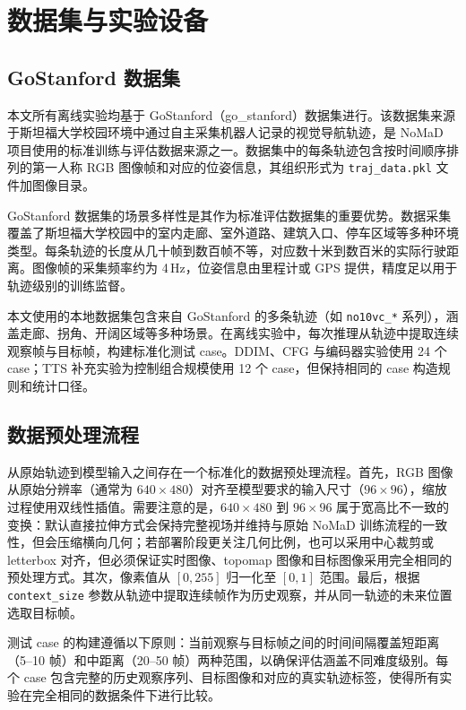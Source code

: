 \section{数据集与实验设备}

\subsection{GoStanford 数据集}

本文所有离线实验均基于 GoStanford（go\_stanford）数据集进行。该数据集来源于斯坦福大学校园环境中通过自主采集机器人记录的视觉导航轨迹，是 NoMaD 项目使用的标准训练与评估数据来源之一\cite{gnm2022,vint2023,nomad2023}。数据集中的每条轨迹包含按时间顺序排列的第一人称 RGB 图像帧和对应的位姿信息，其组织形式为 \texttt{traj\_data.pkl} 文件加图像目录。

GoStanford 数据集的场景多样性是其作为标准评估数据集的重要优势。数据采集覆盖了斯坦福大学校园中的室内走廊、室外道路、建筑入口、停车区域等多种环境类型。每条轨迹的长度从几十帧到数百帧不等，对应数十米到数百米的实际行驶距离。图像帧的采集频率约为 4\,Hz，位姿信息由里程计或 GPS 提供，精度足以用于轨迹级别的训练监督。

本文使用的本地数据集包含来自 GoStanford 的多条轨迹（如 \texttt{no10vc\_*} 系列），涵盖走廊、拐角、开阔区域等多种场景。在离线实验中，每次推理从轨迹中提取连续观察帧与目标帧，构建标准化测试 case。DDIM、CFG 与编码器实验使用 24 个 case；TTS 补充实验为控制组合规模使用 12 个 case，但保持相同的 case 构造规则和统计口径。

\subsection{数据预处理流程}

从原始轨迹到模型输入之间存在一个标准化的数据预处理流程。首先，RGB 图像从原始分辨率（通常为 $640 \times 480$）对齐至模型要求的输入尺寸（$96 \times 96$），缩放过程使用双线性插值。需要注意的是，$640\times480$ 到 $96\times96$ 属于宽高比不一致的变换：默认直接拉伸方式会保持完整视场并维持与原始 NoMaD 训练流程的一致性，但会压缩横向几何；若部署阶段更关注几何比例，也可以采用中心裁剪或 letterbox 对齐，但必须保证实时图像、topomap 图像和目标图像采用完全相同的预处理方式。其次，像素值从 $[0, 255]$ 归一化至 $[0, 1]$ 范围。最后，根据 \texttt{context\_size} 参数从轨迹中提取连续帧作为历史观察，并从同一轨迹的未来位置选取目标帧。

测试 case 的构建遵循以下原则：当前观察与目标帧之间的时间间隔覆盖短距离（5--10 帧）和中距离（20--50 帧）两种范围，以确保评估涵盖不同难度级别。每个 case 包含完整的历史观察序列、目标图像和对应的真实轨迹标签，使得所有实验在完全相同的数据条件下进行比较。

